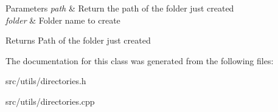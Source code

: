 \begin{DoxyParams}{Parameters}
{\em path} & Return the path of the folder just created \\
\hline
{\em folder} & Folder name to create \\
\hline
\end{DoxyParams}
\begin{DoxyReturn}{Returns}
Path of the folder just created 
\end{DoxyReturn}


The documentation for this class was generated from the following files\+:\begin{DoxyCompactItemize}
\item 
src/utils/directories.\+h\item 
src/utils/directories.\+cpp\end{DoxyCompactItemize}
